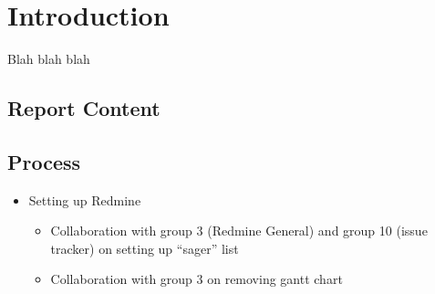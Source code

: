 
\chapter{Introduction}

Blah blah blah

\section{Report Content}

\section{Process}
\begin{itemize}
  \item Setting up Redmine
  \begin{itemize}
    \item Collaboration with group 3 (Redmine General) and group 10 (issue tracker) on setting up ``sager'' list
    \item Collaboration with group 3 on removing gantt chart
  \end{itemize}
\end{itemize}